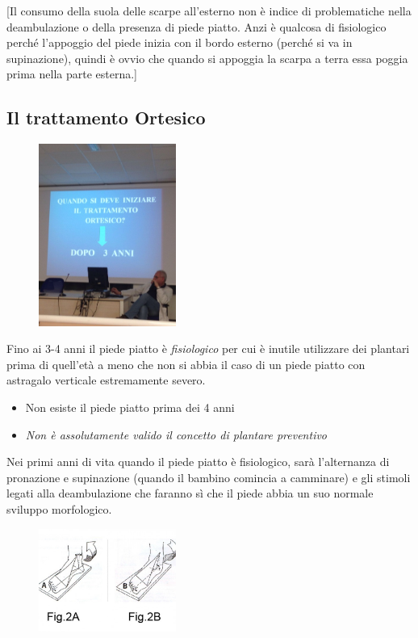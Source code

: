 {[}Il consumo della suola delle scarpe all'esterno non è indice di problematiche nella deambulazione o della presenza di piede piatto. Anzi è qualcosa di fisiologico perché l'appoggio del piede inizia con il bordo esterno (perché si va in supinazione), quindi è ovvio che quando
si appoggia la scarpa a terra essa poggia prima nella parte esterna.{]}

\subsection{Il trattamento Ortesico}

\begin{figure}[!ht]
\centering
\includegraphics[width=0.4\textwidth]{015/image2.jpeg}
\end{figure}


Fino ai 3-4 anni il piede piatto è \emph{fisiologico} per cui è inutile utilizzare dei plantari prima di quell'età a meno che non si abbia il caso di un piede piatto con astragalo verticale estremamente severo.

\begin{itemize}
\item
  Non esiste il piede piatto prima dei 4 anni
\item
  \emph{Non è assolutamente valido il concetto di plantare preventivo}
\end{itemize}

Nei primi anni di vita quando il piede piatto è fisiologico, sarà l'alternanza di pronazione e supinazione (quando il bambino comincia a camminare) e gli stimoli legati alla deambulazione che faranno sì che il piede abbia un suo normale sviluppo morfologico.

\begin{figure}[!ht]
\centering
\includegraphics[width=0.4\textwidth]{015/image3.jpeg}
\end{figure}


